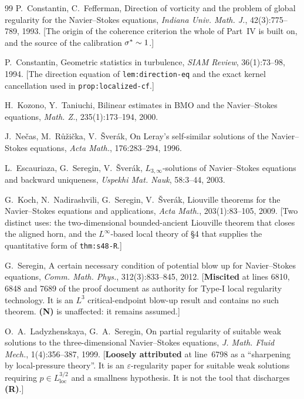 \begin{thebibliography}{99}
  P.~Constantin, C.~Fefferman,
  Direction of vorticity and the problem of global regularity for the
  Navier--Stokes equations,
  \emph{Indiana Univ. Math. J.}, 42(3):775--789, 1993.
  \textsf{[The origin of the coherence criterion the whole of
  Part~IV is built on, and the source of the calibration
  \(\sigma^{*}\sim1\).]}

  P.~Constantin,
  Geometric statistics in turbulence,
  \emph{SIAM Review}, 36(1):73--98, 1994.
  \textsf{[The direction equation of \texttt{lem:direction-eq} and the exact
  kernel cancellation used in \texttt{prop:localized-cf}.]}

  H.~Kozono, Y.~Taniuchi,
  Bilinear estimates in BMO and the Navier--Stokes equations,
  \emph{Math. Z.}, 235(1):173--194, 2000.

  J.~Ne\v{c}as, M.~R\r{u}\v{z}i\v{c}ka, V.~\v{S}ver\'ak,
  On Leray's self-similar solutions of the Navier--Stokes equations,
  \emph{Acta Math.}, 176:283--294, 1996.

  L.~Escauriaza, G.~Seregin, V.~\v{S}ver\'ak,
  \(L_{3,\infty}\)-solutions of Navier--Stokes equations and backward
  uniqueness,
  \emph{Uspekhi Mat. Nauk}, 58:3--44, 2003.

  G.~Koch, N.~Nadirashvili, G.~Seregin, V.~\v{S}ver\'ak,
  Liouville theorems for the Navier--Stokes equations and applications,
  \emph{Acta Math.}, 203(1):83--105, 2009.
  \textsf{[Two distinct uses: the two-dimensional bounded-ancient Liouville
  theorem that closes the aligned horn, and the \(L^\infty\)-based local
  theory of \S4 that supplies the quantitative form of \texttt{thm:s48-R}.]}

  G.~Seregin,
  A certain necessary condition of potential blow up for Navier--Stokes
  equations,
  \emph{Comm. Math. Phys.}, 312(3):833--845, 2012.
  \textsf{[\textbf{Miscited} at lines 6810, 6848 and 7689 of the proof
  document as authority for Type-I local regularity technology. It is an
  \(L^3\) critical-endpoint blow-up result and contains no such theorem.
  \textbf{(N)} is unaffected: it remains assumed.]}

  O.~A.~Ladyzhenskaya, G.~A.~Seregin,
  On partial regularity of suitable weak solutions to the three-dimensional
  Navier--Stokes equations,
  \emph{J. Math. Fluid Mech.}, 1(4):356--387, 1999.
  \textsf{[\textbf{Loosely attributed} at line~6798 as a ``sharpening by
  local-pressure theory''. It is an \(\varepsilon\)-regularity paper for
  suitable weak solutions requiring \(p\in L^{3/2}_{\mathrm{loc}}\) and a
  smallness hypothesis. It is not the tool that discharges \textbf{(R)}.]}


\end{thebibliography}
